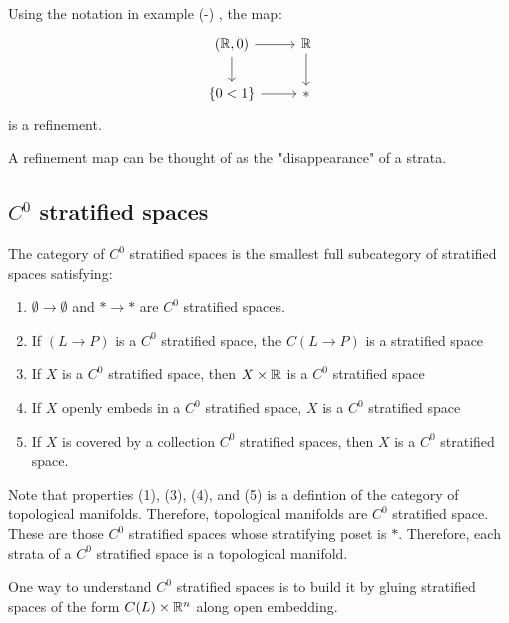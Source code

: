 \begin{ex}
Using the notation in example (-) , the map:
$$
\begin{tikzcd}
{(\R, 0)} \arrow[d] \arrow[r] & \R \arrow[d] \\
\{0<1\} \arrow[r]             & *           
\end{tikzcd}
$$
is a refinement.
\end{ex}

\begin{rek}
A refinement map can be thought of as the "disappearance" of a strata.
\end{rek}


\subsection{$C^0$ stratified spaces}

\begin{defi} 
The category of $C^0$ stratified spaces is the smallest full subcategory of stratified spaces satisfying:
\begin{enumerate}
    \item $\emptyset \rightarrow \emptyset$ and $*\rightarrow *$ are $C^0$
        stratified spaces.
    \item If $(L\rightarrow P)$ is a $C^0$ stratified space, the
        $C(L \rightarrow P)$ is a stratified space
    \item If $X$ is a $C^0$ stratified space, then $X\times \mathbb{R}$ is a $C^0$
        stratified space
    \item If $X$ openly embeds in a $C^0$ stratified space, $X$ is a $C^0$
        stratified space
    \item If $X$ is covered by a collection $C^0$ stratified spaces, then $X$
        is a $C^0$ stratified space.
\end{enumerate}
\end{defi}

\begin{ex}
    Note that properties (1), (3), (4), and (5) is a defintion of the category
    of topological manifolds. Therefore, topological manifolds are $C^0$
    stratified space. These are those $C^0$ stratified spaces whose stratifying
    poset is $*$. Therefore, each strata of a $C^0$ stratified space is a
    topological manifold. 
\end{ex}

One way to understand $C^0$ stratified spaces is to build it by gluing
stratified spaces of the form $C(L)\times \mathbb{R}^n$ along open embedding. 


